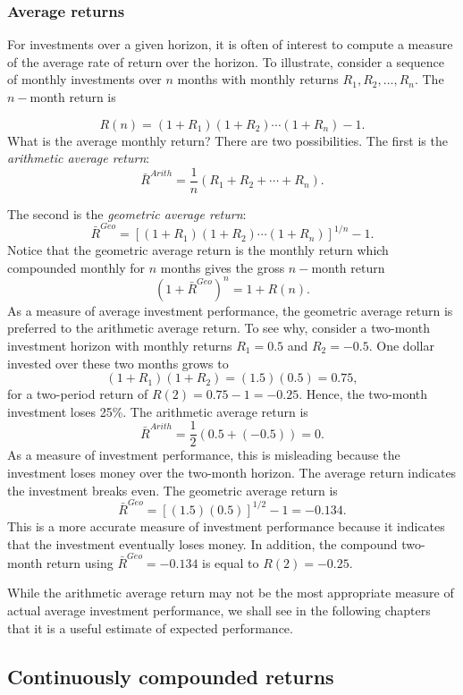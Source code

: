 \documentclass[
  letterpaper,
  DIV=11,
  numbers=noendperiod]{scrreprt}
\theoremstyle{definition}
\theoremstyle{definition}
\theoremstyle{remark}
\begin{document}
\hypertarget{average-returns}{%
\subsubsection{Average returns}\label{average-returns}}

For investments over a given horizon, it is often of interest to compute
a measure of the average rate of return over the horizon. To illustrate,
consider a sequence of monthly investments over \(n\) months with
monthly returns \(R_{1},R_{2},\ldots,R_{n}\). The \(n-\)month return is

\[R(n)=(1+R_{1})(1+R_{2})\cdots(1+R_{n})-1.\] What is the average
monthly return? There are two possibilities. The first is the
\emph{arithmetic average return}:
\[\bar{R}^{Arith}=\frac{1}{n}\left(R_{1}+R_{2}+\cdots+R_{n}\right).\]

The second is the \emph{geometric average
return}:
\[\bar{R}^{Geo}=\left[(1+R_{1})(1+R_{2})\cdots(1+R_{n})\right]^{1/n}-1.\]
Notice that the geometric average return is the monthly return which
compounded monthly for \(n\) months gives the gross \(n-\)month return
\[(1+\bar{R}^{Geo})^{n}=1+R(n).\] As a measure of average investment
performance, the geometric average return is preferred to the arithmetic
average return. To see why, consider a two-month investment horizon with
monthly returns \(R_{1}=0.5\) and \(R_{2}=-0.5\). One dollar invested
over these two months grows to \[
(1+R_{1})(1+R_{2})=(1.5)(0.5)=0.75,
\] for a two-period return of \(R(2)=0.75-1=-0.25\). Hence, the
two-month investment loses 25\%. The arithmetic average return is
\[\bar{R}^{Arith}=\frac{1}{2}\left(0.5+(-0.5)\right)=0.\] As a measure
of investment performance, this is misleading because the investment
loses money over the two-month horizon. The average return indicates the
investment breaks even. The geometric average return is
\[\bar{R}^{Geo}=\left[(1.5)(0.5)\right]^{1/2}-1=-0.134.\] This is a more
accurate measure of investment performance because it indicates that the
investment eventually loses money. In addition, the compound two-month
return using \(\bar{R}^{Geo}=-0.134\) is equal to \(R(2)=-0.25.\)

While the arithmetic average return may not be the most appropriate
measure of actual average investment performance, we shall see in the
following chapters that it is a useful estimate of expected performance.

\hypertarget{continuously-compounded-returns}{%
\subsection{Continuously compounded
returns}\label{continuously-compounded-returns}}
\end{document}
